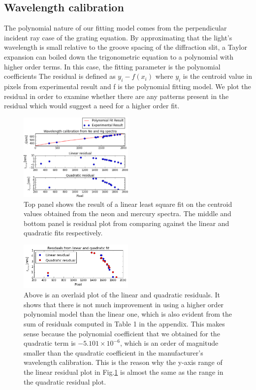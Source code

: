 \documentclass[authoryear,12pt,5p,times]{elsarticle}
\begin{document}
\subsection{Wavelength calibration}
The polynomial nature of our fitting model comes from the perpendicular incident ray case of the grating equation. By approximating that the light's wavelength is small relative to the groove spacing of the diffraction slit, a Taylor expansion can boiled down the trigonometric equation to a polynomial with higher order terms. In this case, the fitting parameter is the polynomial coefficients The residual is defined as $y_i-f(x_i)$ where $y_i$ is the centroid value in pixels from experimental result and f is the polynomial fitting model.  We plot the residual in order to examine whether  there are any patterns present in the residual which would suggest a need for a higher order fit.
\begin{figure}
\includegraphics[width=0.5\textwidth]{figures/neon_calib}
\caption{Top panel shows the result of a linear least square fit on the centroid values obtained from the neon and mercury spectra. The middle and bottom panel is residual plot from comparing against the linear and quadratic fits respectively.}\label{neon_calib}
\end{figure}
\begin{figure}
\label{comp_linquad}
\includegraphics[width=0.5\textwidth]{figures/compare_linquad}
\caption{Above is an overlaid plot of the linear and quadratic residuals. It shows that there is not much improvement in using a higher order polynomial model than the linear one, which is also evident from the sum of residuals computed in Table 1 in the appendix. This makes sense because the polynomial coefficient that we obtained for the quadratic term is $-5.101\times 10^{-6}$, which is an order of magnitude smaller than the quadratic coefficient in the manufacturer's wavelength calibration. This is the reason why the y-axis range of the linear residual plot in Fig.\ref{neon_calib} is almost the same as the range in the quadratic residual plot.} 
\end{figure}
%
\end{document}
